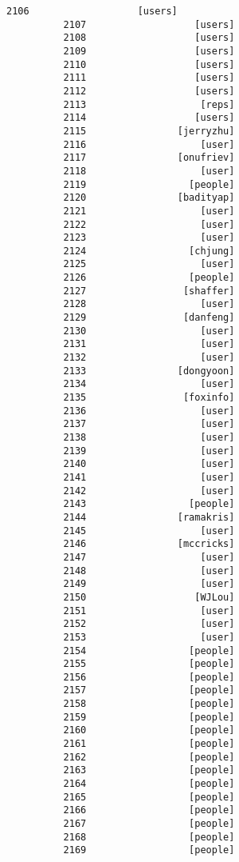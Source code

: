 \documentclass[11pt]{article}
\begin{document}
\begin{Verbatim}[commandchars=\\\{\}]
          2106                   [users]
          2107                   [users]
          2108                   [users]
          2109                   [users]
          2110                   [users]
          2111                   [users]
          2112                   [users]
          2113                    [reps]
          2114                   [users]
          2115                [jerryzhu]
          2116                    [user]
          2117                [onufriev]
          2118                    [user]
          2119                  [people]
          2120                [badityap]
          2121                    [user]
          2122                    [user]
          2123                    [user]
          2124                  [chjung]
          2125                    [user]
          2126                  [people]
          2127                 [shaffer]
          2128                    [user]
          2129                 [danfeng]
          2130                    [user]
          2131                    [user]
          2132                    [user]
          2133                [dongyoon]
          2134                    [user]
          2135                 [foxinfo]
          2136                    [user]
          2137                    [user]
          2138                    [user]
          2139                    [user]
          2140                    [user]
          2141                    [user]
          2142                    [user]
          2143                  [people]
          2144                [ramakris]
          2145                    [user]
          2146                [mccricks]
          2147                    [user]
          2148                    [user]
          2149                    [user]
          2150                   [WJLou]
          2151                    [user]
          2152                    [user]
          2153                    [user]
          2154                  [people]
          2155                  [people]
          2156                  [people]
          2157                  [people]
          2158                  [people]
          2159                  [people]
          2160                  [people]
          2161                  [people]
          2162                  [people]
          2163                  [people]
          2164                  [people]
          2165                  [people]
          2166                  [people]
          2167                  [people]
          2168                  [people]
          2169                  [people]

\end{Verbatim}
\end{document}
